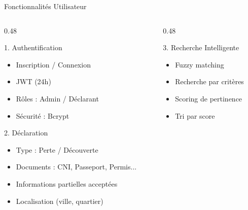 \documentclass[aspectratio=169]{beamer}
\begin{document}
\begin{frame}{Fonctionnalités Utilisateur}
    \begin{columns}[T]
        \begin{column}{0.48\textwidth}
            \begin{block}{1. Authentification}
                \begin{itemize}
                    \item Inscription / Connexion
                    \item JWT (24h)
                    \item Rôles : Admin / Déclarant
                    \item Sécurité : Bcrypt
                \end{itemize}
            \end{block}

            \vspace{0.3cm}

            \begin{block}{2. Déclaration}
                \begin{itemize}
                    \item Type : Perte / Découverte
                    \item Documents : CNI, Passeport, Permis...
                    \item Informations partielles acceptées
                    \item Localisation (ville, quartier)
                \end{itemize}
            \end{block}
        \end{column}
        \begin{column}{0.48\textwidth}
            \begin{block}{3. Recherche Intelligente}
                \begin{itemize}
                    \item Fuzzy matching
                    \item Recherche par critères
                    \item Scoring de pertinence
                    \item Tri par score
                \end{itemize}
            \end{block}

            \vspace{0.3cm}


\end{column}
\end{columns}
\end{frame}
\end{document}
